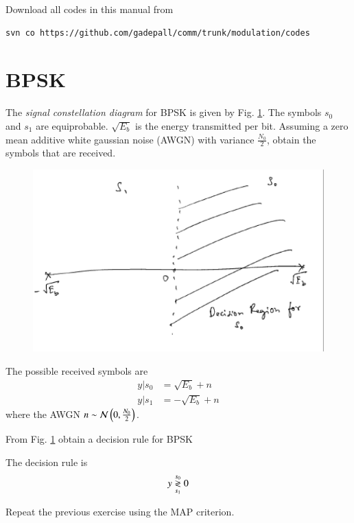 \documentclass[journal,12pt,twocolumn]{IEEEtran}
\begin{document}
Download all codes in this manual from 
\begin{lstlisting}
svn co https://github.com/gadepall/comm/trunk/modulation/codes
\end{lstlisting}

\section{BPSK}
\begin{problem}
The {\em signal constellation diagram} for BPSK is given by Fig. \ref{fig:bpsk_const}.  The symbols $s_0$ and $s_1$ are equiprobable.  $\sqrt{E_b}$ is the energy transmitted per bit. Assuming a zero mean additive white gaussian noise (AWGN) with variance $\frac{N_0}{2}$,
obtain the symbols that are received.
\end{problem}
%
\begin{figure}[!h]
\centering
\includegraphics[width=\columnwidth]{./figs/bpsk_const.eps}
\caption{}
\label{fig:bpsk_const}
\end{figure}
\solution The possible received symbols are
\begin{align}
y|s_0 &= \sqrt{E_b} + n
\\
y|s_1 &= -\sqrt{E_b} + n
\end{align}
%
where the AWGN $n \sim \mathcal{N}\left(0,\frac{N_0}{2}\right)$.
%
\begin{problem}
\label{prob:bpsk_decision}
From Fig. \ref{fig:bpsk_const} obtain a decision rule for BPSK
\end{problem}
\solution The decision rule is
\begin{equation}
y \overset{s_0}{\underset{s_1}{\gtrless}} 0
\end{equation}
\begin{problem}
Repeat the previous exercise using the MAP criterion.
\end{problem}
\end{document}
